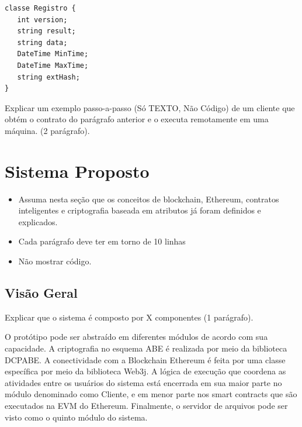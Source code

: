 \documentclass[a4paper,11pt]{article}
\begin{document}
\begin{lstlisting}
classe Registro {
   int version;
   string result;
   string data;
   DateTime MinTime;
   DateTime MaxTime;
   string extHash;
}
\end{lstlisting}


{\color{ForestGreen}Explicar um exemplo passo-a-passo (Só TEXTO, Não Código) de um cliente que obtém o contrato do parágrafo anterior e o executa remotamente em uma máquina. (2 parágrafo).}

\newpage
\section{Sistema Proposto}

\begin{itemize}
    \item {\color{red} Assuma nesta seção que os conceitos de blockchain, Ethereum, contratos inteligentes e criptografia baseada em atributos já foram definidos e explicados.}

    \item {\color{red}Cada parágrafo deve ter em torno de 10 linhas}

    \item {\color{red}Não mostrar código.}

\end{itemize}

\subsection{Visão Geral}
\label{visaogeral}

{\color{ForestGreen}Explicar que o sistema é composto por X componentes (1 parágrafo).}

O protótipo pode ser abstraído em diferentes módulos de acordo com sua capacidade. A criptografia no esquema ABE é realizada por meio da biblioteca DCPABE. A conectividade com a Blockchain Ethereum é feita por uma classe específica por meio da biblioteca Web3j. A lógica de execução que coordena as atividades entre os usuários do sistema está encerrada em sua maior parte no módulo denominado como Cliente, e em menor parte nos smart contracts que são executados na EVM do Ethereum. Finalmente, o servidor de arquivos pode ser visto como o quinto módulo do sistema.
\end{document}
